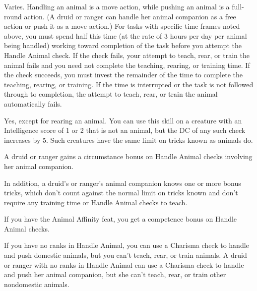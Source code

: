  Varies. Handling an animal is a move action, while pushing an animal is a full-round action. (A druid or ranger can handle her animal companion as a free action or push it as a move action.) For tasks with specific time frames noted above, you must spend half this time (at the rate of 3 hours per day per animal being handled) working toward completion of the task before you attempt the Handle Animal check. If the check fails, your attempt to teach, rear, or train the animal fails and you need not complete the teaching, rearing, or training time. If the check succeeds, you must invest the remainder of the time to complete the teaching, rearing, or training. If the time is interrupted or the task is not followed through to completion, the attempt to teach, rear, or train the animal automatically fails.

 Yes, except for rearing an animal.
 You can use this skill on a creature with an Intelligence score of 1 or 2 that is not an animal, but the DC of any such check increases by 5. Such creatures have the same limit on tricks known as animals do.

A druid or ranger gains a  circumstance bonus on Handle Animal checks involving her animal companion.

In addition, a druid's or ranger's animal companion knows one or more bonus tricks, which don't count against the normal limit on tricks known and don't require any training time or Handle Animal checks to teach.

If you have the Animal Affinity feat, you get a  competence bonus on
Handle Animal checks.

 If you have no ranks in Handle Animal, you can use a Charisma check to handle and push domestic animals, but you can't teach, rear, or train animals. A druid or ranger with no ranks in Handle Animal can use a Charisma check to handle and push her animal companion, but she can't teach, rear, or train other nondomestic animals.

